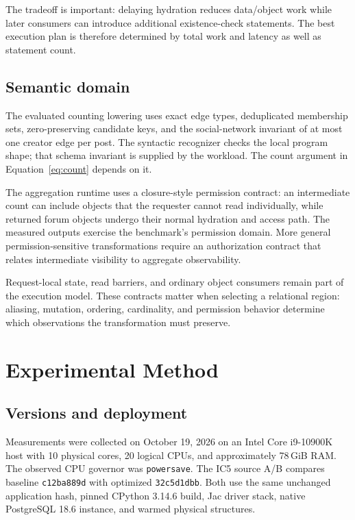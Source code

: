 \documentclass[sigconf,nonacm]{acmart}
\newcommand{\code}[1]{\texttt{#1}}
\begin{document}
The tradeoff is important: delaying hydration reduces data/object work while
later consumers can introduce additional existence-check statements. The best
execution plan is therefore determined by total work and latency as well as
statement count.

\subsection{Semantic domain}
\label{sec:semantics}
The evaluated counting lowering uses exact edge types, deduplicated membership
sets, zero-preserving candidate keys, and the social-network invariant of at
most one creator edge per post. The syntactic recognizer checks the local
program shape; that schema invariant is supplied by the workload. The count
argument in Equation~\ref{eq:count} depends on it.

The aggregation runtime uses a closure-style permission contract: an
intermediate count can include objects that the requester cannot read
individually, while returned forum objects undergo their normal hydration and
access path. The measured outputs exercise the benchmark's permission domain.
More general permission-sensitive transformations require an authorization
contract that relates intermediate visibility to aggregate observability.

Request-local state, read barriers, and ordinary object consumers remain part
of the execution model. These contracts matter when selecting a relational
region: aliasing, mutation, ordering, cardinality, and permission behavior
determine which observations the transformation must preserve.

\section{Experimental Method}
\label{sec:method}

\subsection{Versions and deployment}
Measurements were collected on October 19, 2026 on an Intel Core i9-10900K
host with 10 physical cores, 20 logical CPUs, and approximately 78\,GiB RAM.
The observed CPU governor was \code{powersave}. The IC5 source A/B compares
baseline \code{c12ba889d} with optimized \code{32c5d1dbb}. Both use the same
unchanged application hash, pinned CPython 3.14.6 build, Jac driver stack,
native PostgreSQL 18.6 instance, and warmed physical structures.
\end{document}

